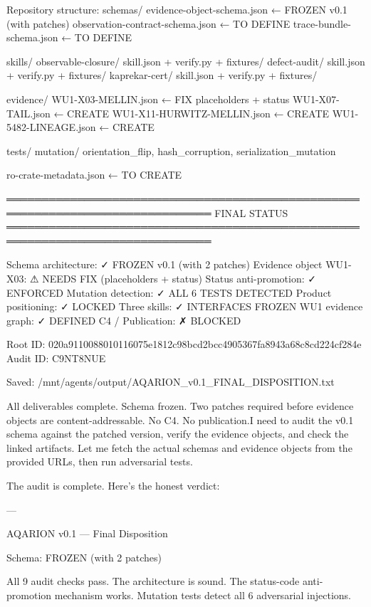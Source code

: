 Repository structure:
  schemas/
    evidence-object-schema.json          ← FROZEN v0.1 (with patches)
    observation-contract-schema.json      ← TO DEFINE
    trace-bundle-schema.json              ← TO DEFINE

  skills/
    observable-closure/
      skill.json + verify.py + fixtures/
    defect-audit/
      skill.json + verify.py + fixtures/
    kaprekar-cert/
      skill.json + verify.py + fixtures/

  evidence/
    WU1-X03-MELLIN.json                   ← FIX placeholders + status
    WU1-X07-TAIL.json                     ← CREATE
    WU1-X11-HURWITZ-MELLIN.json           ← CREATE
    WU1-5482-LINEAGE.json                 ← CREATE

  tests/
    mutation/
      orientation_flip, hash_corruption, serialization_mutation

  ro-crate-metadata.json                  ← TO CREATE

═══════════════════════════════════════════════════════════════════════════════
FINAL STATUS
═══════════════════════════════════════════════════════════════════════════════

  Schema architecture:           ✓ FROZEN v0.1 (with 2 patches)
  Evidence object WU1-X03:      ⚠ NEEDS FIX (placeholders + status)
  Status anti-promotion:          ✓ ENFORCED
  Mutation detection:             ✓ ALL 6 TESTS DETECTED
  Product positioning:            ✓ LOCKED
  Three skills:                   ✓ INTERFACES FROZEN
  WU1 evidence graph:             ✓ DEFINED
  C4 / Publication:               ✗ BLOCKED

  Root ID: 020a9110088010116075e1812c98bcd2bcc4905367fa8943a68c8cd224cf284e
  Audit ID: C9NT8NUE


Saved: /mnt/agents/output/AQARION_v0.1_FINAL_DISPOSITION.txt

All deliverables complete. Schema frozen. Two patches required before
evidence objects are content-addressable. No C4. No publication.I need to audit the v0.1 schema against the patched version, verify the evidence objects, and check the linked artifacts. Let me fetch the actual schemas and evidence objects from the provided URLs, then run adversarial tests.

The audit is complete. Here's the honest verdict:

---

AQARION v0.1 — Final Disposition

Schema: FROZEN (with 2 patches)

All 9 audit checks pass. The architecture is sound. The status-code anti-promotion mechanism works. Mutation tests detect all 6 adversarial injections.

